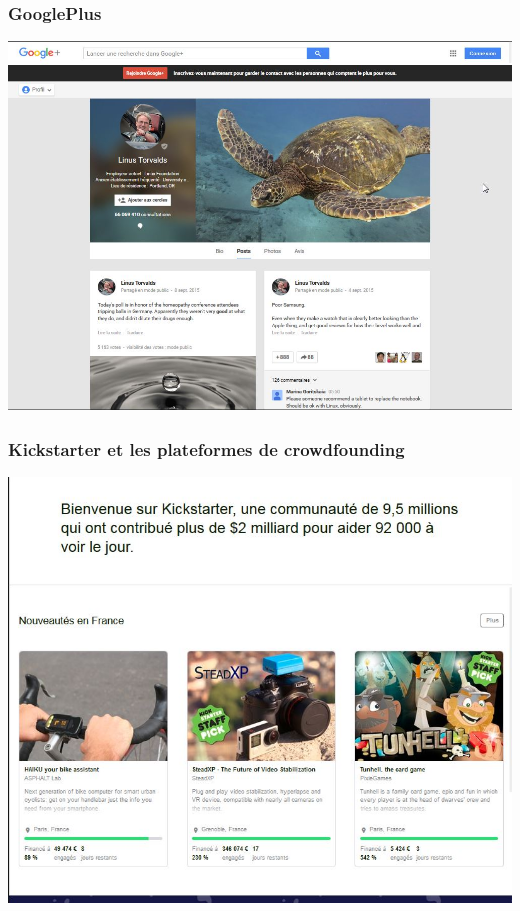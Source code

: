 \documentclass{beamer}
\begin{document}
\begin{frame}
\frametitle{GooglePlus}
\begin{center}
\includegraphics[scale=0.4] {./images/googleplus.jpg} 
\end{center}
\end{frame}

\begin{frame}
\frametitle{Kickstarter et les plateformes de crowdfounding}
\begin{center}
\includegraphics[scale=0.5] {./images/kickstarter.jpg} 
\end{center}
\end{frame}
\end{document}
